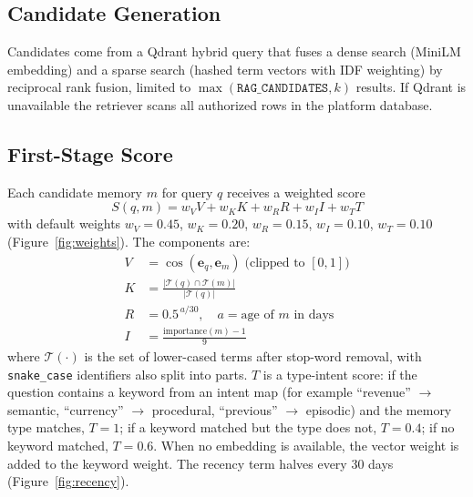 \subsection{Candidate Generation}
Candidates come from a Qdrant hybrid query that fuses a dense search (MiniLM embedding) and
a sparse search (hashed term vectors with IDF weighting) by reciprocal rank fusion, limited
to $\max(\texttt{RAG\_CANDIDATES}, k)$ results. If Qdrant is unavailable the retriever scans
all authorized rows in the platform database.

\subsection{First-Stage Score}
Each candidate memory $m$ for query $q$ receives a weighted score
\begin{equation}
    S(q,m) = w_V V + w_K K + w_R R + w_I I + w_T T
\end{equation}
with default weights $w_V=0.45$, $w_K=0.20$, $w_R=0.15$, $w_I=0.10$, $w_T=0.10$
(Figure~\ref{fig:weights}). The components are:
\begin{align}
    V &= \cos(\mathbf{e}_q, \mathbf{e}_m) \;\text{(clipped to }[0,1]\text{)} \\
    K &= \frac{|\mathcal{T}(q) \cap \mathcal{T}(m)|}{|\mathcal{T}(q)|} \\
    R &= 0.5^{\,a/30}, \quad a = \text{age of } m \text{ in days} \\
    I &= \frac{\text{importance}(m) - 1}{9}
\end{align}
where $\mathcal{T}(\cdot)$ is the set of lower-cased terms after stop-word removal, with
\texttt{snake\_case} identifiers also split into parts. $T$ is a type-intent score: if the
question contains a keyword from an intent map (for example ``revenue'' $\rightarrow$
semantic, ``currency'' $\rightarrow$ procedural, ``previous'' $\rightarrow$ episodic) and
the memory type matches, $T=1$; if a keyword matched but the type does not, $T=0.4$; if no
keyword matched, $T=0.6$. When no embedding is available, the vector weight is added to the
keyword weight. The recency term halves every 30 days (Figure~\ref{fig:recency}).

\begin{figure}[H]
    \centering
\end{figure}

\begin{figure}[H]
    \centering
\end{figure}

